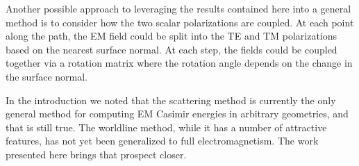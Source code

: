 Another possible approach to leveraging the results contained here into a general method is to consider 
how the two scalar polarizations are coupled.  
At each point along the path, the EM field could be split into the TE and TM polarizations based 
on the nearest surface normal.
At each step, the fields could be coupled together via a rotation matrix where the rotation
angle depends on the change in the surface normal.  

In the introduction we noted that the scattering method is currently the only general
method for computing EM Casimir energies in arbitrary geometries, and that is still true.  
The worldline method, while it has a number of attractive features, has not yet been generalized to full electromagnetism.   
The work presented here brings that prospect closer.  




